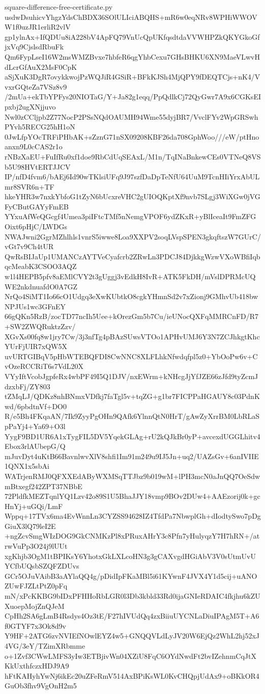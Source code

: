 \documentclass[11pt]{article}
\theoremstyle{definition}
\theoremstyle{remark}
\begin{document}
\begin{filecontents*}[overwrite]{square-difference-free-certificate.py}
usdwDsuhicvYhgzYdsChBDX36SOlULIciABQHS+mR6w0eqNRv8WPHiWWOVW1f0uzJR1erliR2vlV
gp1ylnAx+IfQDUu8iA228bV4ApFQ79VnUcQpUKfqsdtdaVVWHPZkQKYGkoGfjxVq9CjslsdRbuFk
Qm6FypLseI16W2msWMZBvxe7hbfeR6qgYhbCexu7GHsBHKU6XN9MaeVLwvHdLcrGfAuX2MsF0CpK
aSjXuK3DgR7ovykkwojPzWQJiR4GSiR+BFkKJSh4MjQPY9fDEQTCjs+nK4/VvxrGQteZa7VSz8v9
/2mUa+ekTbYPFys20NIOTaG/Y+Ja82g1eqq/PpQdlkCj72QyGwr7A9x6CGKsEIpxbj2ugXNjjuvo
Nwl0zCCljpb2Z77NocP2PSsNQdOAUMH94Wme55dyjBR7/VvclFYv2WpGRSwhPYvh5RECG25hH1oN
0JwLfpYOcTRFiPHbAK+sZznG71nSX09208KBF26da708GphWoo///eW/ptHnoanxn9L0cCAS2r1o
rNBzXaEU+FuIfRu0xf1doe9RbCdUqSEAxL/M1n/TqINaBnkewCEs0VTNeQ8VSb5U98HVtERTJJCV
IP/nfD4fvm6/bAEj6Id90wTKlsiUFq9J97szfDaDpTeNfU64UuM9TcnHIiYrxAbULmr8SVR6n+TF
hkeYHR3w7nxkYbfoG1tZyN6bUcxreVHC2gUIOQKptXf9nvb7SLgj3WiXGw0jVGFyCButGAYyFmEB
YYxuAfWeQGcgf4Umea3piIFtcTMf5nNemgVPOF6ydZKxR+yBlIceaIt9FmZFGOixt6pHjC/LWDGs
NWAJwni2GgrMZhlhls1vnrS5iwwe8Loa9XXPV2soqLVspSPEN3gkqftszW7GUrC/vGt7v9Ch4tUR
QwRsBIJaUp1UMANCzAYTVeCyafcrb2ZRwLn3PDCJ84DjkkgWzwVXoWBfiIqbqcMeabK3CSOO3AQZ
w1l4HEPB5pfv8aEMlCVY2t3gUggj3vEdkH8IvR+ATK5FkDH/mVslDPRMcUQWE2nkdnuafdO0A7GZ
NrQo4SiMT1Io66cO1Udgq3eXwKUbtkO8cgkYHmnSd2v7xZionj9GMhvUb418bwNPJUs1wc3GFnEY
66gQKn5RzB/zocTD77ncIh5Uee+kOrezGm5b7Cu/ieUNocQXFqMMRCnFD/R7+SW2ZWQRuktzZzv/
XGvXs00fq8w1jry7Cw/3j3nfTg4pBAzSUwsVTOo1APHvUMJ6Y3N7ZCJhkgtKhcYUrFjUIR7xQW5X
uvURTGIBqV5pHbWTEBQFDI8CwNNC8XLFLhkNfwdqfpl5z0+YbOoPw6v+CvOzeRCCRiT6s7VdL20X
VYyIftVcobJgpfeRx4wbPF49I5Q1DJV/nxEWrm+kNHcgJjYfJZE66zJfd9tyZcmJdzxbFj/ZY803
tZMqLJ/QDKz8nhBNmxVDfkj7faTgl5v+tqZG+g1br7FICPPaHGAUY8c03PdnKwd/6pbdtnVf+DO0
R/e5Bh4FKqaAN/7Ik9ZyyPgOHn9QAfk6YlnnQtN0HrT/gAwZyXrrBM0LbRLaSpPaYj4+Ya69+O3l
YygF9BD1UR6A1xTygFIL5DV5YqekGLAg+rU2kQJkBr0yP+avcexdUGGLhitv4Ebox3rlAUbepG/Q
mJuvDyt4uKtB66BavnlwvXlV8shfi1Im91m249u9IJ5Jn+uq2/UAZsGv+6anIVIIE1QNX1x5sbAi
WATrjenRMJ0QFXXEdAByWXMSqTTJbz9b019wM+lPH3mcN0aJnQQ7OeSdwmBtxegf242ZPT37NBbE
72PldfkMEZTqnlYQ1Lzv42o89S1U5BhaJJY18vmp9BOv2DUw4+AAEzorij0k+gcHnYj+uGQi/LmF
Wppq+17TVx6ma4EvWnnLn3CYZSS94628IZ4TfdPa7NbwplGh+dIodtySwo7pDgGiuX3lQ79leI2E
+ngZcvSmgWIzDOG9GkCNMKzPl8xPRuxAHrY3c8Pfn7yHulyqzY7H7hRN+/atrwVuPp3O24j9lUUt
xgKhjb3OgM1tBPIKsY6YhotxGkLXLcoHN3g3gCAXvgdHGiAbV3V0sUtmUvUYCfbUQsbSZQFZDUvs
GCr5OJuVAibB3aAYlaQQ4g/pDidIpFKaMBl5i61KYwnF4JVX4Y1d5cij+uANOZUwFJZLtPtZ0pFq
mN/xPcKKBG9bIDxPFHHoRbLGR0l3Db3kbld33Rd0ijaGNIeRDAIC4fkjhu6kZUXuoepMojZnQJeM
CpHh2SA6gLmB4Rsdys4Oz3tE/F27hIVUdQq4zxBiiuUYCNLaDiuIPAgM5T+A6f0GTYF7x3Ok8d9v
Y9HF+2ATG6zvNVIEfNOwlEYZ4w5+GNQQVLdLyJV20W6EjQz2WhL2hj52xJ4VG/3eY/TZimXRbmme
o+1Zvf3CWwLMFS3yIw3ETBjivWn04XZiU8FqC6OYdNwdFt2bvIZehnmCqJtXKkUxthfczxHDJ9A9
hFtKAHyhYwNj6ikEc20uZFeRmV514AxBPiKsWL0KvCHQpjUdAx9+oBKkOR4GuOb3fhv9VgOnH2m5

\end{filecontents*}
\end{document}
